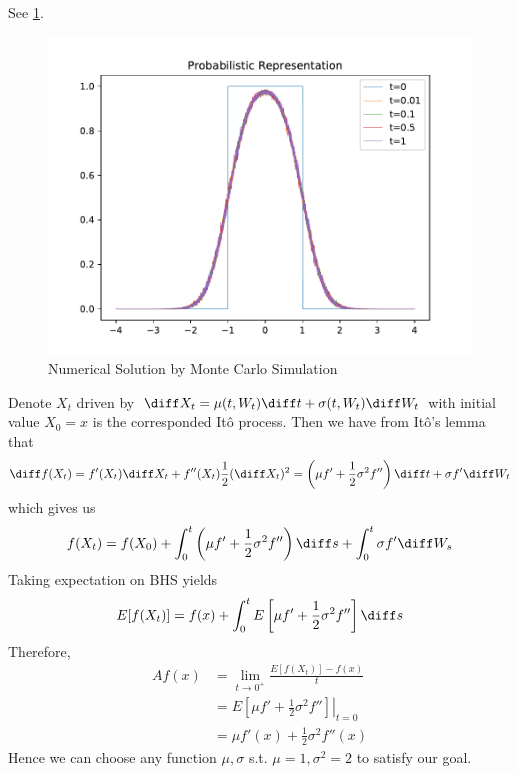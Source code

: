 \begin{subproblem}
    \item
    See \cref{fig:prob sol}.
    \begin{figure}[h]
        \centering
        \includegraphics[width=\textwidth]{prob-sol}
        \caption{Numerical Solution by Monte Carlo Simulation}
        \label{fig:prob sol}
    \end{figure}
\end{subproblem}

\problem
Denote $X_t$ driven by $\diff X_t=\mu(t,W_t)\diff t+\sigma(t,W_t)\diff W_t$
with initial value $X_0=x$
is the corresponded It\^o process. Then we have from It\^o's lemma
that
\[\diff f(X_t)=f'(X_t)\diff X_t+f''(X_t)\frac{1}{2}(\diff X_t)^2
=\left(\mu f'+\frac{1}{2}\sigma^2 f''\right)\diff t+\sigma f'\diff W_t\]
which gives us
\[f(X_t)=f(X_0)+\int_0^t\left(\mu f'+\frac{1}{2}\sigma^2 f''\right)\diff s
+\int_0^t\sigma f'\diff W_s\]
Taking expectation on BHS yields
\[E[f(X_t)]=f(x)+\int_0^tE\left[\mu f'+\frac{1}{2}\sigma^2 f''\right]\diff s\]
Therefore,
\[\begin{aligned}
    Af(x)&=\lim_{t\to 0^+}\frac{E[f(X_t)]-f(x)}{t}\\
    &=\left.E\left[\mu f'+\frac{1}{2}\sigma^2 f''\right]\right|_{t=0}\\
    &=\mu f'(x)+\frac{1}{2}\sigma^2 f''(x)
\end{aligned}\]
Hence we can choose any function $\mu,\sigma$ s.t. $\mu=1,\sigma^2=2$ to
satisfy our goal.

